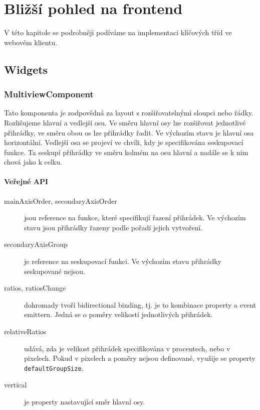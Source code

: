 \chapter{Bližší pohled na frontend}
\label{chap:frontend}

V této kapitole se podrobněji podíváme na implementaci klíčových tříd ve webovém klientu.

\section{Widgets}

\subsection{MultiviewComponent}

Tato komponenta je zodpovědná za layout s rozšiřovatelnými sloupci nebo řádky. Rozlišujeme hlavní a vedlejší osu. Ve směru hlavní osy lze rozšiřovat jednotlivé přihrádky, ve směru obou os lze přihrádky řadit. Ve výchozím stavu je hlavní osa horizontální. Vedlejší osa se projeví ve chvíli, kdy je specifikována seskupovací funkce. Ta seskupí přihrádky ve směru kolmém na osu hlavní a nadále se k nim chová jako k celku.

\subsubsection*{Veřejné API}

\begin{description}
  \item[mainAxisOrder, secondaryAxisOrder] jsou reference na funkce, které specifikují řazení přihrádek. Ve výchozím stavu jsou přihrádky řazeny podle pořadí jejich vytvoření.
  \item[secondaryAxisGroup] je reference na seskupovací funkci. Ve výchozím stavu přihrádky seskupované nejsou.
  \item[ratios, ratiosChange] dohromady tvoří bidirectional binding, tj. je to kombinace property a event emitteru. Jedná se o poměry velikostí jednotlivých přihrádek.
  \item[relativeRatios] udává, zda je velikost přihrádek specifikována v procentech, nebo v pixelech. Pokud v pixelech a poměry nejsou definované, využije se property \lstinline|defaultGroupSize|.
  \item[vertical] je property nastavující směr hlavní osy.
\end{description}

